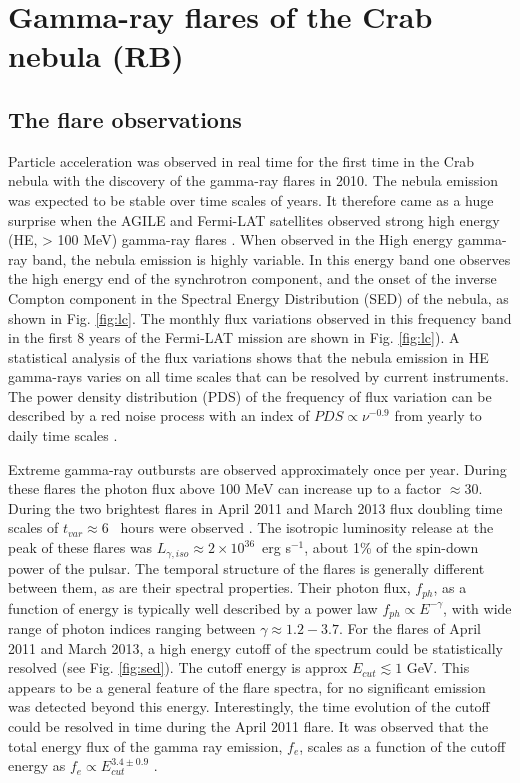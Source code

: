\section{Gamma-ray flares of the Crab nebula (RB)}
\label{sec:flares}

\subsection{The flare observations}

Particle acceleration was observed in real time for the first time in the Crab nebula with the discovery of the gamma-ray flares in 2010.  The nebula emission was expected to  be stable over time scales of years. It therefore came as a huge surprise when the AGILE and Fermi-LAT satellites observed strong high energy (HE, > 100 MeV) gamma-ray flares \citep{Tavani2011,Abdo2011}. When observed in the High energy  gamma-ray band, the nebula emission is highly variable. In this energy band one observes the high energy end of the synchrotron component, and the onset of the inverse Compton component in the Spectral Energy Distribution (SED) of the nebula, as shown in Fig. \ref{fig:lc}. The monthly flux variations observed in this frequency band in the first 8 years of the Fermi-LAT mission are shown in Fig. \ref{fig:lc}). A statistical analysis of the flux variations shows that the nebula emission in HE gamma-rays varies on all time scales that can be resolved by current instruments. The power density distribution (PDS) of the frequency of flux variation can be described by a red noise process with an index of $PDS \propto \nu^{-0.9}$  from yearly to daily time scales \citep{buehler2012}.

Extreme gamma-ray outbursts are observed approximately once per year. During these flares the photon flux above 100 MeV can increase up to a factor $\approx 30$. During the two brightest flares in April 2011 and March 2013 flux doubling time scales of $t_{var}\approx 6$~ hours were observed \citep{buehler2012,Mayer2013}. The isotropic luminosity release at the peak of these flares was $L_{\gamma, iso} \approx 2 \times 10^{36}$~erg s$^{-1}$, about 1\% of the spin-down power of the pulsar. The temporal structure of the flares is generally different between them, as are their spectral properties. Their photon flux, $f_{ph}$,  as a function of energy is typically well described by a power law $f_{ph} \propto E^{-\gamma}$, with  wide range of photon indices ranging between  $\gamma \approx 1.2 - 3.7$. For the flares of April 2011 and March 2013, a high energy cutoff of the spectrum could be statistically resolved (see Fig. \ref{fig:sed}). The cutoff energy is approx $E_{cut} \lesssim 1$ GeV. This appears to be a general feature of the flare spectra, for no significant emission was detected beyond this energy. Interestingly, the time evolution of the cutoff could be resolved in time during the April 2011 flare. It was observed that the total energy flux of the gamma ray emission, $f_e$,  scales as a function of the cutoff energy as $f_e \propto E_{cut}^{3.4 \pm 0.9}$  \citep{buehler2012}.

